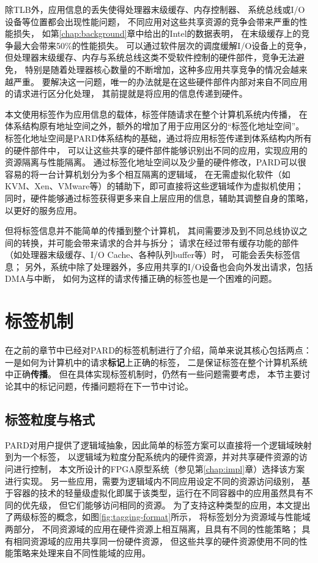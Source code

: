 除TLB外，应用信息的丢失使得处理器末级缓存、内存控制器、
系统总线或I/O设备等位置都会出现性能问题，
不同应用对这些共享资源的竞争会带来严重的性能损失，
如第\ref{chap:background}章中给出的Intel的数据表明，
在末级缓存上的竞争最大会带来50\%的性能损失\cite{}。
可以通过软件层次的调度缓解I/O设备上的竞争，
但处理器末级缓存、内存与系统总线这类不受软件控制的硬件部件，竞争无法避免，
特别是随着处理器核心数量的不断增加，这种多应用共享竞争的情况会越来越严重。
要解决这一问题，唯一的办法就是在这些硬件部件内部对来自不同应用的请求进行区分化处理，
其前提就是将应用的信息传递到硬件。

本文使用标签作为应用信息的载体，标签伴随请求在整个计算机系统内传播，
在体系结构原有地址空间之外，额外的增加了用于应用区分的``标签化地址空间''。
标签化地址空间是PARD体系结构的基础，通过将应用标签传递到体系结构内所有的硬件部件中，
可以让这些共享的硬件部件能够识别出不同的应用，实现应用的资源隔离与性能隔离。
通过标签化地址空间以及少量的硬件修改，PARD可以很容易的将一台计算机划分为多个相互隔离的逻辑域，
在无需虚拟化软件（如KVM、Xen、VMware等）的辅助下，即可直接将这些逻辑域作为虚拟机使用；
同时，硬件能够通过标签获得更多来自上层应用的信息，辅助其调整自身的策略，以更好的服务应用。

但将标签信息并不能简单的传播到整个计算机，
其间需要涉及到不同总线协议之间的转换，并可能会带来请求的合并与拆分；
请求在经过带有缓存功能的部件（如处理器末级缓存、I/O Cache、各种队列buffer等）时，
可能会丢失标签信息；
另外，系统中除了处理器外，多应用共享的I/O设备也会向外发出请求，包括DMA与中断，
如何为这样的请求传播正确的标签也是一个困难的问题。


\section{标签机制}

在之前的章节中已经对PARD的标签机制进行了介绍，简单来说其核心包括两点：
一是如何为计算机中的请求\textbf{标记}上正确的标签，
二是保证标签在整个计算机系统中正确\textbf{传播}。
但在具体实现标签机制时，仍然有一些问题需要考虑，
本节主要讨论其中的标记问题，传播问题将在下一节中讨论。


\subsection{标签粒度与格式}

PARD对用户提供了逻辑域抽象，因此简单的标签方案可以直接将一个逻辑域映射到为一个标签，
以逻辑域为粒度分配系统内的硬件资源，并对共享硬件资源的访问进行控制，
本文所设计的FPGA原型系统（参见第\ref{chap:impl}章）选择该方案进行实现。
另一些应用，需要为逻辑域内不同应用设定不同的资源访问级别，
基于容器的技术的轻量级虚拟化即属于该类型，运行在不同容器中的应用虽然具有不同的优先级，
但它们能够访问相同的资源。
为了支持这种类型的应用，本文提出了两级标签的概念，如图\ref{fig:tagging-format}所示，
将标签划分为资源域与性能域两部分，
不同资源域的应用在硬件资源上相互隔离，且具有不同的性能策略；
具有相同资源域的应用共享同一份硬件资源，
但这些共享的硬件资源使用不同的性能策略来处理来自不同性能域的应用。


